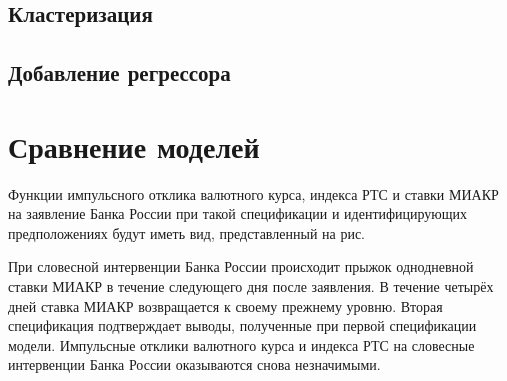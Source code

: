 \documentclass[12pt,a4paper, oneside]{extreport}
\begin{document}
\subsection{Кластеризация}

\subsection{Добавление регрессора}

\section{Сравнение моделей}



Функции импульсного отклика валютного курса, индекса РТС и ставки МИАКР на заявление Банка России при такой спецификации и идентифицирующих предположениях будут иметь вид, представленный на рис.%


При словесной интервенции Банка России происходит прыжок однодневной ставки МИАКР в течение следующего дня после заявления. В течение четырёх дней ставка МИАКР возвращается к своему прежнему уровню. Вторая спецификация подтверждает выводы, полученные при первой спецификации модели. Импульсные отклики валютного курса и индекса РТС на словесные интервенции Банка России оказываются снова незначимыми.
\end{document}
